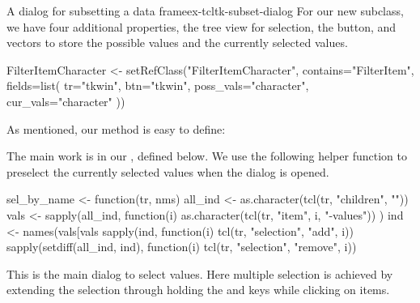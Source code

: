 \begin{example}{A dialog for subsetting a data frame}{ex-tcltk-subset-dialog}
For our new subclass, we have four additional properties, the tree
view for selection, the button, and vectors to store the possible
values and the currently selected values.
\begin{Schunk}
\begin{Sinput}
 FilterItemCharacter <- 
   setRefClass("FilterItemCharacter",
               contains="FilterItem",
               fields=list(
                 tr="tkwin",
                 btn="tkwin",
                 poss_vals="character",
                 cur_vals="character"
                 ))
\end{Sinput}
\end{Schunk}

As mentioned, our  method is easy to define:
\begin{Schunk}
\end{Schunk}

The main work is in our , defined
below. We use the following helper function to preselect the currently
selected values when the dialog is opened.
\begin{Schunk}
\begin{Sinput}
 sel_by_name <- function(tr, nms) {
   all_ind <- as.character(tcl(tr, "children", ""))
   vals <- sapply(all_ind, function(i) {
     as.character(tcl(tr, "item", i, "-values"))
   })
   ind <- names(vals[vals %
   sapply(ind, function(i) tcl(tr, "selection", "add", i))
   sapply(setdiff(all_ind, ind), 
          function(i) tcl(tr, "selection", "remove", i))
 }
\end{Sinput}
\end{Schunk}

This is the main dialog to select values. Here multiple selection is
achieved by extending the selection through holding the 
and  keys while clicking on items.

\begin{Schunk}
\end{Schunk}
\end{example}
